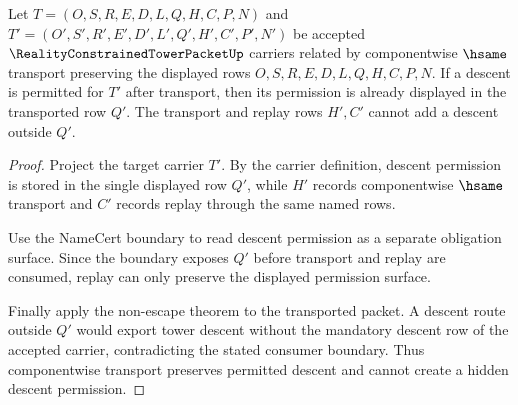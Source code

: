 \begin{theorem}
\label{thm:reality-constrained-tower-packet-descent-permission-stability}
Let $T=(O,S,R,E,D,L,Q,H,C,P,N)$ and $T'=(O',S',R',E',D',L',Q',H',C',P',N')$ be accepted $\RealityConstrainedTowerPacketUp$ carriers related by componentwise $\hsame$ transport preserving the displayed rows $O,S,R,E,D,L,Q,H,C,P,N$. If a descent is permitted for $T'$ after transport, then its permission is already displayed in the transported row $Q'$. The transport and replay rows $H',C'$ cannot add a descent outside $Q'$.
\end{theorem}
\begin{proof}
Project the target carrier $T'$. By the carrier definition, descent permission is stored in the single displayed row $Q'$, while $H'$ records componentwise $\hsame$ transport and $C'$ records replay through the same named rows.

Use the NameCert boundary to read descent permission as a separate obligation surface. Since the boundary exposes $Q'$ before transport and replay are consumed, replay can only preserve the displayed permission surface.

Finally apply the non-escape theorem to the transported packet. A descent route outside $Q'$ would export tower descent without the mandatory descent row of the accepted carrier, contradicting the stated consumer boundary. Thus componentwise transport preserves permitted descent and cannot create a hidden descent permission.
\end{proof}

